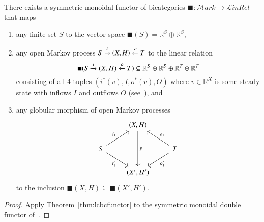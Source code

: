 \begin{thm}
  There exists a symmetric monoidal functor of bicategories $\blacksquare : \mathcal{M}\mathit{ark} \to \mathcal{L}\mathit{inRel}$ that maps
  \begin{enumerate}
  \item any finite set $S$ to the vector space $\blacksquare(S) = \mathbb{R}^S \oplus \mathbb{R}^S$,
  \item any open Markov process $S \xrightarrow{i} (X,H) \xleftarrow{o} T$ to the linear relation
    \[ \blacksquare(S \xrightarrow{i} (X,H) \xleftarrow{o} T) \subseteq \mathbb{R}^S\oplus \mathbb{R}^S\oplus \mathbb{R}^T\oplus \mathbb{R}^T \]
    consisting of all 4-tuples $(i^*(v),I,o^*(v),O)$ where $v\in \mathbb{R}^X$ is some steady state with inflows $I$ and outflows $O$ (see~\cite[Definition 2.7]{bc:markov}), and
  \item any globular morphism of open Markov processes
    \[
      \begin{tikzcd}
        & {(X,H)} \arrow[dd, "p"] &  \\
        S \arrow[ru, "i_1"] \arrow[rd, "i_1'"'] &  & T \arrow[lu, "o_1"'] \arrow[ld, "o_1'"] \\
        & {(X',H')} & 
      \end{tikzcd}
    \]
    to the inclusion $\blacksquare(X,H) \subseteq \blacksquare(X',H')$.
  \end{enumerate}
\end{thm}
\begin{proof}
  Apply Theorem~\ref{thm:lcbcfunctor} to the symmetric monoidal double functor of~\cite[Theorem 5.5]{bc:markov}.
\end{proof}

